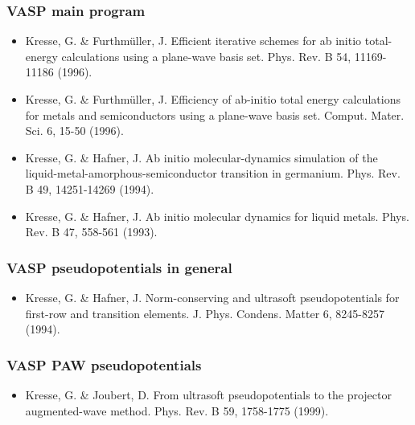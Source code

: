 \documentclass[letterpaper,10pt,english]{sphinxmanual}
\begin{document}
\subsubsection{VASP main program}
\label{15_0_citations:vasp-main-program}\begin{itemize}
\item {} 
Kresse, G. \& Furthmüller, J. Efficient iterative schemes for ab initio total-energy calculations using a plane-wave basis set. Phys. Rev. B 54, 11169-11186 (1996).

\item {} 
Kresse, G. \& Furthmüller, J. Efficiency of ab-initio total energy calculations for metals and semiconductors using a plane-wave basis set. Comput. Mater. Sci. 6, 15-50 (1996).

\item {} 
Kresse, G. \& Hafner, J. Ab initio molecular-dynamics simulation of the liquid-metal-amorphous-semiconductor transition in germanium. Phys. Rev. B 49, 14251-14269 (1994).

\item {} 
Kresse, G. \& Hafner, J. Ab initio molecular dynamics for liquid metals. Phys. Rev. B 47, 558-561 (1993).

\end{itemize}


\subsubsection{VASP pseudopotentials in general}
\label{15_0_citations:vasp-pseudopotentials-in-general}\begin{itemize}
\item {} 
Kresse, G. \& Hafner, J. Norm-conserving and ultrasoft pseudopotentials for first-row and transition elements. J. Phys. Condens. Matter 6, 8245-8257 (1994).

\end{itemize}


\subsubsection{VASP PAW pseudopotentials}
\label{15_0_citations:vasp-paw-pseudopotentials}\begin{itemize}
\item {} 
Kresse, G. \& Joubert, D. From ultrasoft pseudopotentials to the projector augmented-wave method. Phys. Rev. B 59, 1758-1775 (1999).

\end{itemize}
\end{document}
